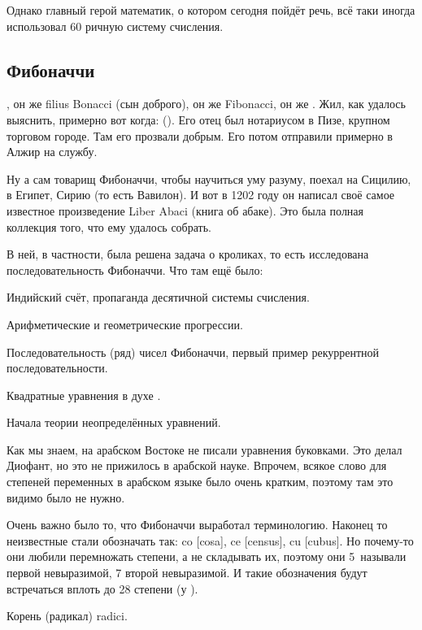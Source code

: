 \documentclass[a4paper,oneside,fleqn,10pt]{article}
\begin{document}
Однако главный герой математик, о котором сегодня пойдёт речь, всё таки иногда
использовал 60 ричную систему счисления.

\subsection{Фибоначчи}

, он же filius Bonacci (сын доброго), он же
Fibonacci, он же . Жил, как удалось выяснить, примерно вот когда:
().
Его отец был нотариусом в Пизе, крупном торговом городе.
Там его прозвали добрым. Его потом отправили примерно в Алжир на службу.

Ну а сам товарищ Фибоначчи, чтобы научиться уму разуму, поехал на Сицилию, в Египет, Сирию (то есть Вавилон).
И вот в 1202 году он написал своё самое известное произведение Liber Abaci (книга об абаке).
Это была полная коллекция того, что ему удалось собрать.

В ней, в частности, была решена задача о кроликах, то есть исследована последовательность Фибоначчи.
Что там ещё было:

\begin{items}{-2}
\item Индийский счёт, пропаганда десятичной системы счисления.
\item Арифметические и геометрические прогрессии.
\item Последовательность (ряд) чисел Фибоначчи, первый пример рекуррентной последовательности.
\item Квадратные уравнения в духе .
\item Начала теории неопределённых уравнений.
\end{items}

Как мы знаем, на арабском Востоке не писали уравнения буковками. Это делал Диофант,
но это не прижилось в арабской науке. Впрочем, всякое слово для степеней переменных
в арабском языке было очень кратким, поэтому там это видимо было не нужно.

Очень важно было то, что Фибоначчи выработал  терминологию.
Наконец то неизвестные стали обозначать так: co [cosa], ce [census], cu [cubus].
Но почему-то они любили перемножать степени, а не складывать их, поэтому они 5~называли
первой невыразимой, 7 второй невыразимой. И такие обозначения будут встречаться
вплоть до 28 степени (у ).

Корень (радикал) radici.
\end{document}

